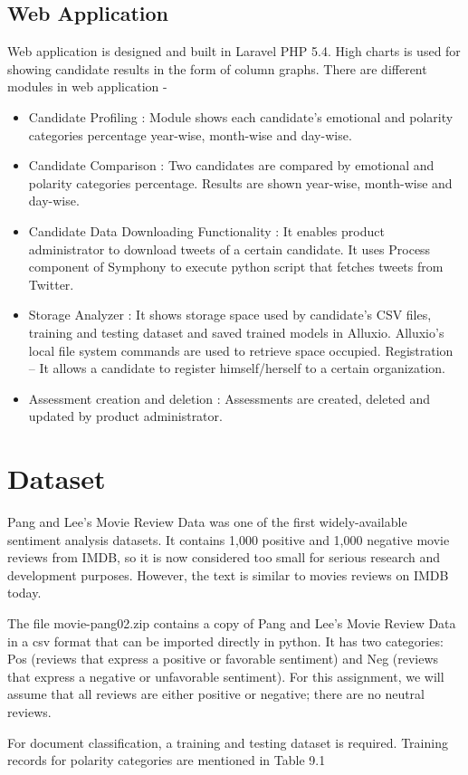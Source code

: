 \documentclass[oneside,a4paper,12pt]{pictreport}
\begin{document}
\subsection{Web Application}
Web application is designed and built in Laravel PHP 5.4. High charts is used for showing candidate results in the form of column graphs. There are different modules in web application - 
\begin{itemize}
\item Candidate Profiling : Module shows each candidate's emotional and polarity categories percentage year-wise, month-wise and day-wise.
\item Candidate Comparison : Two candidates are compared by emotional and polarity categories percentage. Results are shown year-wise, month-wise and day-wise.
\item Candidate Data Downloading Functionality : It enables product administrator to download tweets of a certain candidate. It uses Process component of Symphony to execute python script that fetches tweets from Twitter.
\item Storage Analyzer : It shows storage space used by candidate's CSV files, training and testing dataset and saved trained models in Alluxio. Alluxio's local file system commands are used to retrieve space occupied. 
Registration – It allows a candidate to register himself/herself to a certain organization. 
\item Assessment creation and deletion : Assessments are created, deleted and updated by product administrator. 
\end{itemize}

\section{Dataset}
\hspace{1.1cm} Pang and Lee's Movie Review Data was one of the first widely-available sentiment analysis datasets. It contains 1,000 positive and 1,000 negative movie reviews from IMDB, so it is now considered too small for serious research and development purposes. However, the text is similar to movies reviews on IMDB today.

\par The file movie-pang02.zip contains a copy of Pang and Lee's Movie Review Data in a csv format that can be imported directly in python. It has two categories: Pos (reviews that express a positive or favorable sentiment) and Neg (reviews that express a negative or unfavorable sentiment). For this assignment, we will assume that all reviews are either positive or negative; there are no neutral reviews. 
\par For document classification, a training and testing dataset is required. Training records for polarity categories are mentioned in Table 9.1
\end{document}

